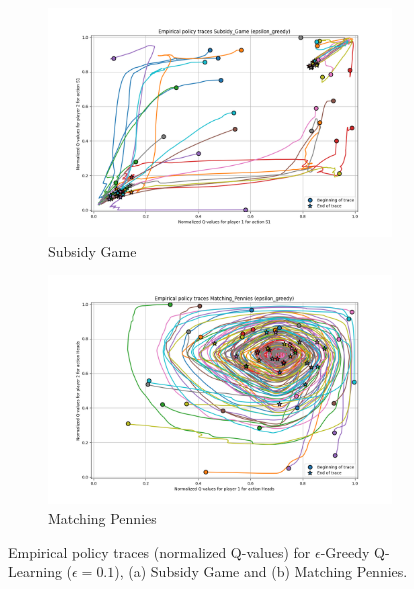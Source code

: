 \documentclass[12pt,a4paper, onecolumn]{exam}
\begin{document}
\begin{figure}[h]
    \centering
    \begin{subfigure}{0.49\textwidth}
        \centering
        \includegraphics[width=\linewidth]{plots/replicator_trajectoreis_Subsidy_Game_epsilon_greedy.png}
        \caption{Subsidy Game}
        \label{fig:egsg}
    \end{subfigure}
    \hfill
    \begin{subfigure}{0.49\textwidth}
        \centering
        \includegraphics[width=\linewidth]{plots/replicator_trajectoreis_Matching_Pennies_epsilon_greedy.png}
        \caption{Matching Pennies}
        \label{fig:egpd}
    \end{subfigure}
    \caption{Empirical policy traces (normalized Q-values) for $\epsilon$-Greedy Q-Learning ($\epsilon=0.1$), (a) Subsidy Game and (b) Matching Pennies.}
    \label{fig:greedy_combined}
\end{figure}
\end{document}
